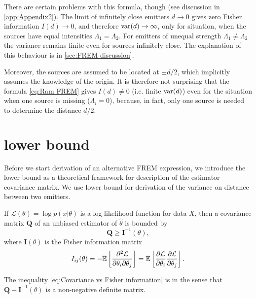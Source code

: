There are certain problems with this formula, though (see discussion in \autoref{app:Appendix2}). The limit of infinitely close emitters $d\rightarrow0$ gives  zero Fisher information $I(d)\rightarrow0$, and therefore $\mathrm{var}(d)\rightarrow\infty$, only for situation, when the sources have equal intensities $\Lambda_1=\Lambda_2$. For emitters of unequal strength $\Lambda_1\neq\Lambda_2$ the variance remains finite even for sources infinitely close. The explanation of this behaviour is in \autoref{sec:FREM discussion}.

Moreover, the sources are assumed to be located at $\pm d/2$, which implicitly assumes the knowledge of the origin. It is therefore not surprising that the formula \autoref{eq:Ram FREM} gives $I(d)\neq0$ (i.e. finite $\mathrm{var}(d)$) even for the situation when one source is missing ($\Lambda_i=0$), because, in fact, only one source is needed to determine the distance $d/2$. 


\section{\CR lower bound}

Before we start derivation of an alternative FREM expression, we introduce the \CR lower bound as a theoretical framework for description of the estimator covariance matrix. We use \CR lower bound for derivation of the variance on distance between two emitters.
  
If $\mathcal{L}(\theta)=\log p(x|\theta)$ is a log-likelihood function for data $X$, then a covariance matrix $\bm{Q}$ of an unbiased estimator of $\hat{\theta}$ is bounded by \cite{Rao1945,Cover1991} 
%
\begin{equation}
	\bm{Q}\geq\bm{I}^{-1}(\theta),
	\label{eq:Covariance vs Fisher information}
\end{equation}
%
where $\bm{I}(\theta)$ is the Fisher information matrix 
%
\begin{equation}
	I_{ij}(\theta)=-\mathbb{E}\left[\frac{\partial^2\mathcal{L}}{\partial\theta_i\partial\theta_j}\right]=\mathbb{E}\left[\frac{\partial\mathcal{L}}{\partial\theta_i}\frac{\partial\mathcal{L}}{\partial\theta_j}\right].
	\label{eq:Fisher information general}
\end{equation}

The inequality \autoref{eq:Covariance vs Fisher information} is in the sense that $\bm{Q}-\bm{I}^{-1}(\theta)$ is a non-negative definite matrix.


